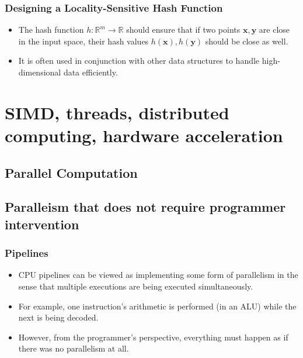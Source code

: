 \documentclass[12pt]{article}
\begin{document}
\subsubsection{Designing a Locality-Sensitive Hash Function}

\begin{itemize}
    \item The hash function \( h \colon \mathbb{R}^m \to \mathbb{R} \) should ensure that if two points \( \mathbf{x}, \mathbf{y} \) are close in the input space, their hash values \( h(\mathbf{x}), h(\mathbf{y}) \) should be close as well.
    \item It is often used in conjunction with other data structures to handle high-dimensional data efficiently.
\end{itemize}






















\newpage
\section{SIMD, threads, distributed computing, hardware acceleration}
\subsection{Parallel Computation}

\subsection{Paralleism that does not require programmer intervention}

\subsubsection{Pipelines}
\begin{itemize}
    \item CPU pipelines can be viewed as implementing some form of parallelism in the sense that multiple executions are being executed simultaneously.
    \item For example, one instruction’s arithmetic is performed (in an ALU) while the next is being decoded.
    \item However, from the programmer’s perspective, everything must happen as if there was no parallelism at all.
\end{itemize}
\end{document}
